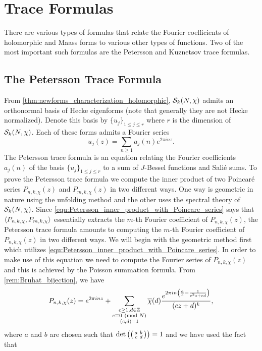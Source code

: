 \chapter{Trace Formulas}
  There are various types of formulas that relate the Fourier coefficients of holomorphic and Maass forms to various other types of functions. Two of the most important such formulas are the Petersson and Kuznetsov trace formulas.
  \section{The Petersson Trace Formula}
    From \cref{thm:newforms_characterization_holomorphic}, $\mathcal{S}_{k}(N,\chi)$ admits an orthonormal basis of Hecke eigenforms (note that generally they are not Hecke normalized). Denote this basis by $\{u_{j}\}_{1 \le j \le r}$ where $r$ is the dimension of $\mathcal{S}_{k}(N,\chi)$. Each of these forms admits a Fourier series
    \[
      u_{j}(z) = \sum_{n \ge 1}a_{j}(n)e^{2\pi inz}.
    \]
    The Petersson trace formula is an equation relating the Fourier coefficients $a_{j}(n)$ of the basis $\{u_{j}\}_{1 \le j \le r}$ to a sum of $J$-Bessel functions and Sali\'e sums. To prove the Petersson trace formula we compute the inner product of two Poincar\'e series $P_{n,k,\chi}(z)$ and $P_{m,k,\chi}(z)$ in two different ways. One way is geometric in nature using the unfolding method and the other uses the spectral theory of $\mathcal{S}_{k}(N,\chi)$. Since \cref{equ:Petersson_inner_product_with_Poincare_series} says that $\langle P_{n,k,\chi},P_{m,k,\chi}\rangle$ essentially extracts the $m$-th Fourier coefficient of $P_{n,k,\chi}(z)$, the Petersson trace formula amounts to computing the $m$-th Fourier coefficient of $P_{n,k,\chi}(z)$ in two different ways. We will begin with the geometric method first which utilizes \cref{equ:Petersson_inner_product_with_Poincare_series}. In order to make use of this equation we need to compute the Fourier series of $P_{n,k,\chi}(z)$ and this is achieved by the Poisson summation formula. From \cref{rem:Bruhat_bijection}, we have
    \[
      P_{n,k,\chi}(z) = e^{2\pi inz}+\sum_{\substack{c \ge 1, d \in \mathbb{Z} \\ c \equiv 0 \ \left(\text{mod }N\right) \\ (c,d) = 1}}\overline{\chi}(d)\frac{e^{2\pi in\left(\frac{a}{c}-\frac{1}{c^{2}z+cd}\right)}}{(cz+d)^{k}},
    \]
    where $a$ and $b$ are chosen such that $\det\left(\begin{psmallmatrix} a & b \\ c & d \end{psmallmatrix}\right) = 1$ and we have used the fact that
